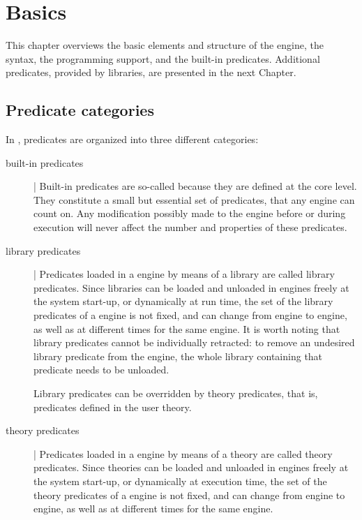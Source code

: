 \chapter{\tuprolog{} Basics}
\label{ch:engine}

This chapter overviews the basic elements and structure of the \tuprolog{} engine, the \tuprolog{} syntax, the programming support, and the built-in predicates.
%
Additional predicates, provided by libraries, are presented in the next Chapter.

\section{Predicate categories}
\label{sec:predicate-categories}

In \tuprolog{}, predicates are organized into three different categories:
%
\begin{description}
\item[built-in predicates] |
Built-in predicates are so-called because they are defined at the \tuprolog{} core level. They constitute a small but essential set of predicates, that any \tuprolog{} engine can count on.
%
Any modification possibly made to the engine before or during execution will never affect the number and properties of these predicates.


\item[library predicates] |
Predicates loaded in a \tuprolog{} engine by means of a \tuprolog{} library are called library predicates.
%
Since libraries can be loaded and unloaded in \tuprolog{} engines freely at the system start-up, or dynamically at run time, the set of the library predicates of a \tuprolog{} engine is not fixed, and can change from engine to engine, as well as at different times for the same engine.
%
It is worth noting that library predicates cannot be individually retracted: to remove an undesired library predicate from the engine, the whole library containing that predicate needs to be unloaded.
%

Library predicates can be overridden by theory predicates, that is, predicates defined in the user theory.


\item[theory predicates] |
Predicates loaded in a \tuprolog{} engine by means of a \tuprolog{} theory are called theory predicates.
%
Since theories can be loaded and unloaded in \tuprolog{} engines freely at the system start-up, or dynamically at execution time, the set of the theory predicates of a \tuprolog{} engine is not fixed, and can change from engine to engine, as well as at different times for the same engine.
%
\end{description}


